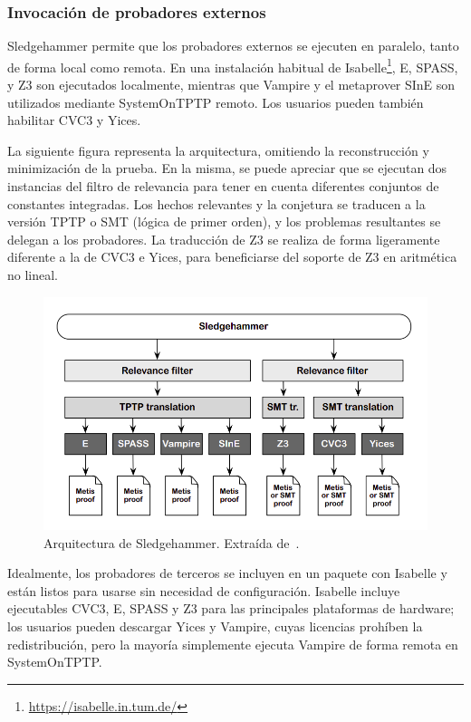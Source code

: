\documentclass[12pt]{book}
\begin{document}
\subsubsection{Invocación de probadores externos}

Sledgehammer permite que los probadores externos se ejecuten en paralelo, tanto de forma local como remota. En una instalación habitual de Isabelle\footnote{\url{https://isabelle.in.tum.de/}}, E, SPASS, y Z3 son ejecutados localmente, mientras que Vampire y el metaprover SInE son utilizados mediante SystemOnTPTP remoto. Los usuarios pueden también habilitar CVC3 y Yices.

La siguiente figura representa la arquitectura, omitiendo la reconstrucción y minimización de la prueba. En la misma, se puede apreciar que se ejecutan dos instancias del filtro de relevancia para tener en cuenta diferentes conjuntos de constantes integradas. Los hechos relevantes y la conjetura se traducen a la versión TPTP o SMT (lógica de primer orden), y los problemas resultantes se delegan a los probadores. La traducción de Z3 se realiza de forma ligeramente diferente a la de CVC3 e Yices, para beneficiarse del soporte de Z3 en aritmética no lineal.

\begin{figure}[H]
	\centering
	\includegraphics[width=\textwidth]{Sledgehammer_arquitecture.png}
    \caption[Arquitectura de Sledgehammer.]{Arquitectura de Sledgehammer. Extraída de~\cite{proof_and_disproof}.}\label{fig:Sledgehammer_arquitecture}
\end{figure}

Idealmente, los probadores de terceros se incluyen en un paquete con Isabelle y están listos para usarse sin necesidad de configuración. Isabelle incluye ejecutables CVC3, E, SPASS y Z3 para las principales plataformas de hardware; los usuarios pueden descargar Yices y Vampire, cuyas licencias prohíben la redistribución, pero la mayoría simplemente ejecuta Vampire de forma remota en SystemOnTPTP.\@
\end{document}
